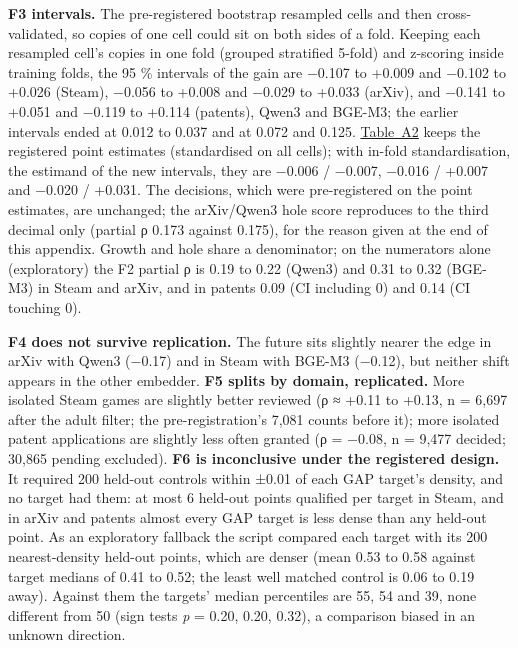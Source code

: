 \documentclass[
  10pt,
]{article}
\begin{document}
\textbf{F3 intervals.} The
pre-registered bootstrap resampled cells
and then cross-validated, so copies of
one cell could sit on both sides of a
fold. Keeping each resampled cell's
copies in one fold (grouped stratified
5-fold) and z-scoring inside training
folds, the 95 \% intervals of the gain
are −0.107 to +0.009 and −0.102 to
+0.026 (Steam), −0.056 to +0.008 and
−0.029 to +0.033 (arXiv), and −0.141 to
+0.051 and −0.119 to +0.114 (patents),
Qwen3 and BGE-M3; the earlier intervals
ended at 0.012 to 0.037 and at 0.072 and
0.125. \hyperref[tab:A2]{Table~A2} keeps
the registered point estimates
(standardised on all cells); with
in-fold standardisation, the estimand of
the new intervals, they are −0.006 /
−0.007, −0.016 / +0.007 and −0.020 /
+0.031. The decisions, which were
pre-registered on the point estimates,
are unchanged; the arXiv/Qwen3 hole
score reproduces to the third decimal
only (partial ρ 0.173 against 0.175),
for the reason given at the end of this
appendix. Growth and hole share a
denominator; on the numerators alone
(exploratory) the F2 partial ρ is 0.19
to 0.22 (Qwen3) and 0.31 to 0.32
(BGE-M3) in Steam and arXiv, and in
patents 0.09 (CI including 0) and 0.14
(CI touching 0).

\textbf{F4 does not survive
replication.} The future sits slightly
nearer the edge in arXiv with Qwen3
(−0.17) and in Steam with BGE-M3
(−0.12), but neither shift appears in
the other embedder. \textbf{F5 splits by
domain, replicated.} More isolated Steam
games are slightly better reviewed (ρ ≈
+0.11 to +0.13, n = 6,697 after the
adult filter; the pre-registration's
7,081 counts before it); more isolated
patent applications are slightly less
often granted (ρ = −0.08, n = 9,477
decided; 30,865 pending excluded).
\textbf{F6 is inconclusive under the
registered design.} It required 200
held-out controls within ±0.01 of each
GAP target's density, and no target had
them: at most 6 held-out points
qualified per target in Steam, and in
arXiv and patents almost every GAP
target is less dense than any held-out
point. As an exploratory fallback the
script compared each target with its 200
nearest-density held-out points, which
are denser (mean 0.53 to 0.58 against
target medians of 0.41 to 0.52; the
least well matched control is 0.06 to
0.19 away). Against them the targets'
median percentiles are 55, 54 and 39,
none different from 50 (sign tests
\emph{p} = 0.20, 0.20, 0.32), a
comparison biased in an unknown
direction.
\end{document}
